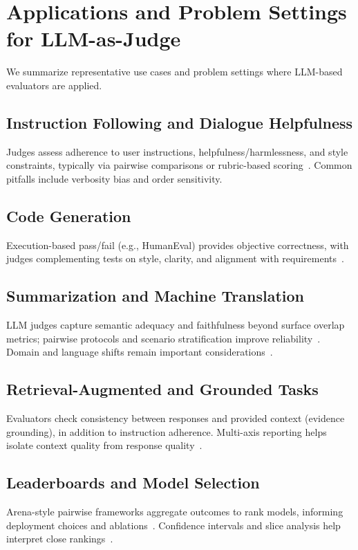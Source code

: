 \section{Applications and Problem Settings for LLM-as-Judge} 
We summarize representative use cases and problem settings where LLM-based evaluators are applied.

\subsection{Instruction Following and Dialogue Helpfulness}
Judges assess adherence to user instructions, helpfulness/harmlessness, and style constraints, typically via pairwise comparisons or rubric-based scoring~\cite{zheng2023judgelm, li2024_llmsasjudges}. Common pitfalls include verbosity bias and order sensitivity.

\subsection{Code Generation}
Execution-based pass/fail (e.g., HumanEval) provides objective correctness, with judges complementing tests on style, clarity, and alignment with requirements~\cite{chen2021evaluating, li2024_llmsasjudges}.

\subsection{Summarization and Machine Translation}
LLM judges capture semantic adequacy and faithfulness beyond surface overlap metrics; pairwise protocols and scenario stratification improve reliability~\cite{fu2023gptscore, liang2022helm}. Domain and language shifts remain important considerations~\cite{hada2024metal}.

\subsection{Retrieval-Augmented and Grounded Tasks}
Evaluators check consistency between responses and provided context (evidence grounding), in addition to instruction adherence. Multi-axis reporting helps isolate context quality from response quality~\cite{liang2022helm, li2024_llmsasjudges}.

\subsection{Leaderboards and Model Selection}
Arena-style pairwise frameworks aggregate outcomes to rank models, informing deployment choices and ablations~\cite{zheng2023judgelm}. Confidence intervals and slice analysis help interpret close rankings~\cite{bavaresco2024judgebench}.


